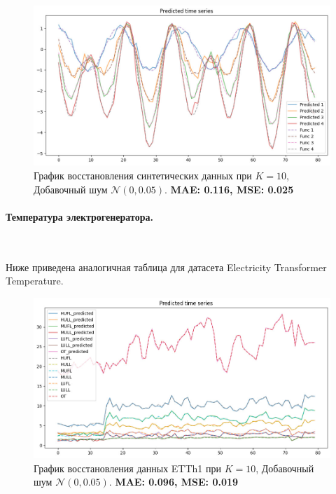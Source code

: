 \documentclass{article}
\begin{document}
\begin{figure}[H]
	\centering
	\includegraphics[width=\textwidth]{K10N005.jpg}
	\caption{График восстановления синтетических данных при $K=10$, Добавочный шум $\mathcal{N}(0, 0.05)$. \textbf{MAE: 0.116, MSE: 0.025}}
	\label{fig:fig6}
\end{figure}

\paragraph{Температура электрогенератора.}\

Ниже приведена аналогичная таблица для датасета Electricity Transformer Temperature.

\begin{figure}[H]
	\centering
	\includegraphics[width=\textwidth]{K10N005_electicity.jpg}
	\caption{График восстановления данных ETTh1 при $K=10$, Добавочный шум $\mathcal{N}(0, 0.05)$. \textbf{MAE: 0.096, MSE: 0.019}}
	\label{fig:fig7}
\end{figure}
\end{document}
